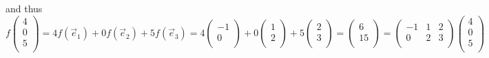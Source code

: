 \documentclass{article}
\theoremstyle{remark}
\begin{document}
    and thus
    \[f\begin{pmatrix}4\\0\\5\\\end{pmatrix}=4f(\vec{e}_1)+0f(\vec{e}_2)+5f(\vec{e}_3)=4\begin{pmatrix}-1\\0\\\end{pmatrix}+0\begin{pmatrix}1\\2\\\end{pmatrix}+5\begin{pmatrix}2\\3\\\end{pmatrix}=\begin{pmatrix}6\\15\\\end{pmatrix}=\begin{pmatrix}-1&1&2\\0&2&3\\\end{pmatrix}\begin{pmatrix}4\\0\\5\\\end{pmatrix}\]
\end{document}
